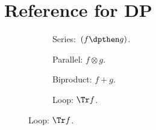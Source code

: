 
\section{Reference for DP}

\begin{figure}[h!]
    \centering
    \begin{subfigure}{0.2\textwidth}
        \centering
        \caption{Series:~$(f \dpthen g)$.}
    \end{subfigure}
    \hspace{10mm} %
    \begin{subfigure}{0.2\textwidth}
        \centering
        \caption{Parallel: $f \otimes g$.}
    \end{subfigure}
    \hspace{10mm} %
    \begin{subfigure}{0.2\textwidth}
        \centering
        \caption{Biproduct: $f + g$.}
    \end{subfigure}
    \hspace{10mm} %
    \begin{subfigure}{0.2\textwidth}
        \centering
        \caption{Loop: $\Tr f$.}
    \end{subfigure}
    \label{fig:diagrams}
\end{figure}

